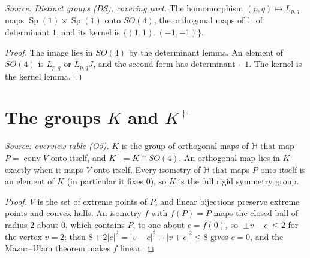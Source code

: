 \begin{theorem}
  \label{thm:double-cover}
  \leanok
  \textit{Source: Distinct groups (DS), covering part.}
  The homomorphism \((p,q)\mapsto L_{p,q}\) maps
  \(\operatorname{Sp}(1)\times\operatorname{Sp}(1)\) onto \(SO(4)\), the
  orthogonal maps of \(\mathbb H\) of determinant \(1\), and its kernel is
  \(\{(1,1),(-1,-1)\}\).
\end{theorem}
\begin{proof}
  \leanok
  The image lies in \(SO(4)\) by the determinant lemma. An element of
  \(SO(4)\) is \(L_{p,q}\) or \(L_{p,q}J\), and the second form has
  determinant \(-1\). The kernel is the kernel lemma.
\end{proof}

\section{The groups \texorpdfstring{\(K\)}{K} and \texorpdfstring{\(K^+\)}{K+}}

\begin{definition}[\(K\) and \(K^+\)]
  \label{def:symmetry-group}
  \leanok
  \textit{Source: overview table (O5).}
  \(K\) is the group of orthogonal maps of \(\mathbb H\) that map
  \(P=\operatorname{conv}V\) onto itself, and \(K^+=K\cap SO(4)\). An
  orthogonal map lies in \(K\) exactly when it maps \(V\) onto itself. Every
  isometry of \(\mathbb H\) that maps \(P\) onto itself is an element
  of \(K\) (in particular it fixes \(0\)), so \(K\) is the full rigid
  symmetry group.
\end{definition}
\begin{proof}
  \leanok
  \(V\) is the set of extreme points of \(P\), and linear bijections
  preserve extreme points and convex hulls. An isometry \(f\) with
  \(f(P)=P\) maps the closed ball of radius \(2\) about \(0\), which
  contains \(P\), to one about \(c=f(0)\), so \(|\pm v-c|\le2\) for the
  vertex \(v=2\); then \(8+2|c|^2=|v-c|^2+|v+c|^2\le8\) gives \(c=0\), and
  the Mazur--Ulam theorem makes \(f\) linear.
\end{proof}

